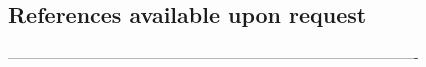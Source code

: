 \documentclass[a4paper]{twentysecondcv} %
\begin{document}
\subsection{\textcolor{mainblue}{References available upon request}}


----------------------------------------------------------------------------------------








\end{document}
